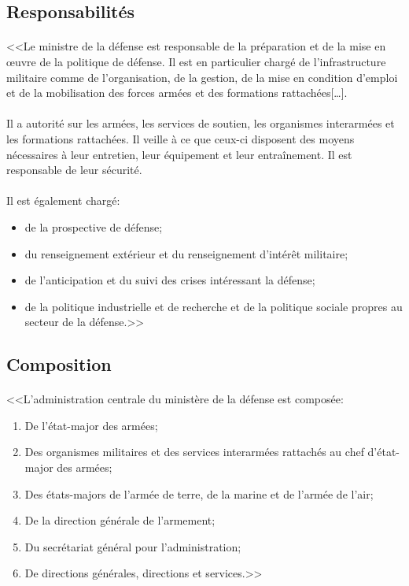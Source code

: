 \documentclass[11pt, book, english, french]{upmethodology-document}
\begin{document}
			\subsection{Responsabilités}
				\paragraph*{}
					<<Le ministre de la défense est responsable de la préparation et de la mise en œuvre de la politique de défense. Il est en particulier chargé de l'infrastructure militaire comme de l'organisation, de la gestion, de la mise en condition d'emploi et de la mobilisation des forces armées et des formations rattachées[\ldots].
				\paragraph*{}
					Il a autorité sur les armées, les services de soutien, les organismes interarmées et les formations rattachées. Il veille à ce que ceux-ci disposent des moyens nécessaires à leur entretien, leur équipement et leur entraînement. Il est responsable de leur sécurité.
				\paragraph*{}
					Il est également chargé:
					\begin{itemize}
						\item de la prospective de défense;
						\item du renseignement extérieur et du renseignement d'intérêt militaire;
						\item de l'anticipation et du suivi des crises intéressant la défense;
						\item de la politique industrielle et de recherche et de la politique sociale propres au secteur de la défense.>>\cite{CodeDefenseL1142-1}
					\end{itemize}
			\subsection{Composition}
				\paragraph*{}
					<<L'administration centrale du ministère de la défense est composée:
					\begin{enumerate}
						\item De l'état-major des armées;
						\item Des organismes militaires et des services interarmées rattachés au chef d'état-major des armées;
						\item Des états-majors de l'armée de terre, de la marine et de l'armée de l'air;
						\item De la direction générale de l'armement;
						\item Du secrétariat général pour l'administration;
						\item De directions générales, directions et services.>>\cite{DEFD0918712D}
					\end{enumerate}
\end{document}
